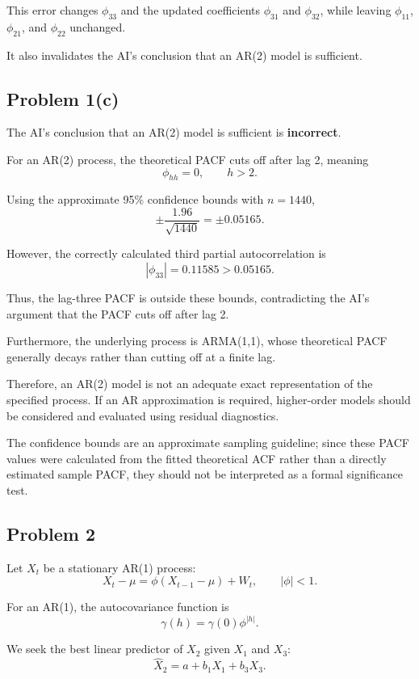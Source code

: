 \documentclass[11pt]{article}
\begin{document}
This error changes \(\phi_{33}\) and the
updated coefficients \(\phi_{31}\) and
\(\phi_{32}\), while leaving \(\phi_{11}\),
\(\phi_{21}\), and \(\phi_{22}\) unchanged.

It also invalidates the AI's conclusion
that an AR(2) model is sufficient.

\subsection*{Problem 1(c)}

The AI's conclusion that an AR(2) model
is sufficient is \textbf{incorrect}.

For an AR(2) process, the theoretical PACF
cuts off after lag 2, meaning
\[
\phi_{hh}=0,\qquad h>2.
\]

Using the approximate 95\% confidence bounds
with \(n=1440\),
\[
\pm\frac{1.96}{\sqrt{1440}}
=\boxed{\pm0.05165}.
\]

However, the correctly calculated
third partial autocorrelation is
\[
\boxed{
|\phi_{33}|=0.11585>0.05165.
}
\]

Thus, the lag-three PACF is outside these
bounds, contradicting the AI's argument
that the PACF cuts off after lag 2.

Furthermore, the underlying process is
ARMA(1,1), whose theoretical PACF generally
decays rather than cutting off at a finite lag.

Therefore, an AR(2) model is not an adequate
exact representation of the specified process.
If an AR approximation is required, higher-order
models should be considered and evaluated using
residual diagnostics.

The confidence bounds are an approximate
sampling guideline; since these PACF values
were calculated from the fitted theoretical
ACF rather than a directly estimated sample
PACF, they should not be interpreted as a
formal significance test.


\subsection*{Problem 2}

Let \(X_t\) be a stationary AR(1) process:
\[
X_t-\mu=\phi(X_{t-1}-\mu)+W_t,
\qquad |\phi|<1.
\]

For an AR(1), the autocovariance function is
\[
\gamma(h)=\gamma(0)\phi^{|h|}.
\]

We seek the best linear predictor of \(X_2\)
given \(X_1\) and \(X_3\):
\[
\hat X_2=a+b_1X_1+b_3X_3.
\]
\end{document}
